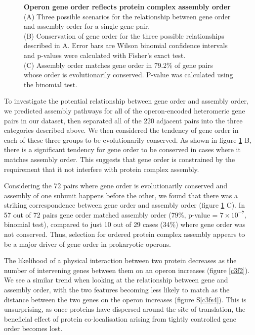 \documentclass[a4paper,11pt,twoside,openright]{scrbook}
\begin{document}
\begin{figure}[h]
    \caption[Operon gene order reflects protein complex assembly order]{\sffamily \textbf{Operon gene order reflects protein complex assembly order} \\ \small (A) Three possible scenarios for the relationship between gene order and assembly order for a single gene pair.\\
    (B) Conservation of gene order for the three possible relationships described in A. Error bars are Wilson binomial confidence intervals and p-values were calculated with Fisher's exact test.\\
    (C) Assembly order matches gene order in 79.2\% of gene pairs whose order is evolutionarily conserved. P-value was calculated using the binomial test.}
    \label{c3f3}
\end{figure}

To investigate the potential relationship between gene order and assembly order, we predicted assembly pathways for all of the operon-encoded heteromeric gene pairs in our dataset, then separated all of the 220 adjacent pairs into the three categories described above. We then considered the tendency of gene order in each of these three groups to be evolutionarily conserved. As shown in figure \ref{c3f3} B, there is a significant tendency for gene order to be conserved in cases where it matches assembly order. This suggests that gene order is constrained by the requirement that it not interfere with protein complex assembly.

Considering the 72 pairs where gene order is evolutionarily conserved and assembly of one subunit happens before the other, we found that there was a striking correspondence between gene order and assembly order (figure \ref{c3f3} C). In 57 out of 72 pairs gene order matched assembly order (79\%, p-value = \(7 \times 10^{-7}\), binomial test), compared to just 10 out of 29 cases (34\%) where gene order was not conserved. Thus, selection for ordered protein complex assembly appears to be a major driver of gene order in prokaryotic operons.

The likelihood of a physical interaction between two protein decreases as the number of intervening genes between them on an operon increases (figure \ref{c3f2}). We see a similar trend when looking at the relationship between gene and assembly order, with the two features becoming less likely to match as the distance between the two genes on the operon increases (figure S\ref{c3fs4}). This is unsurprising, as once proteins have dispersed around the site of translation, the beneficial effect of protein co-localisation arising from tightly controlled gene order becomes lost.
\end{document}
